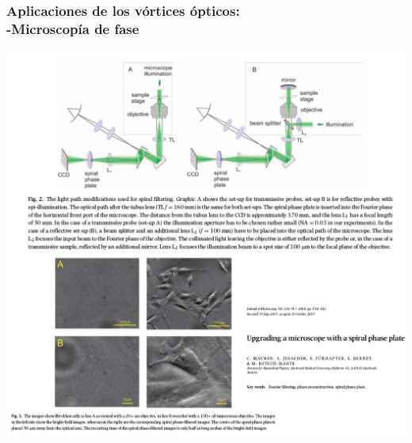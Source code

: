 \documentclass[serif,8pt]{beamer}
\begin{document}
		\begin{frame}
		\frametitle{Aplicaciones de los vórtices ópticos:\\-Microscopía de fase}
				\begin{center}
				\includegraphics[scale = 0.4, keepaspectratio]{img/micro.pdf}
				\end{center}
		\end{frame}
		
\end{document}
